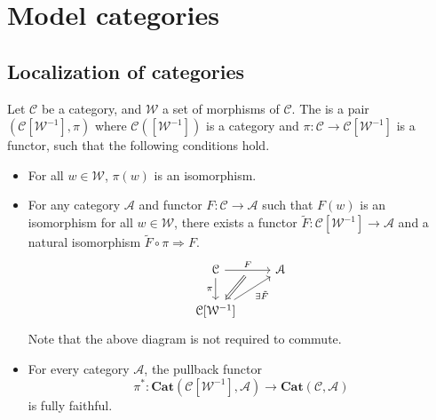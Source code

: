 \documentclass[main.tex]{subfiles}
\begin{document}
\chapter{Model categories}
\label{ch:model_categories}

\section{Localization of categories}
\label{sec:localization_of_categories}

\begin{definition}
  \label{def:localization_of_a_category}
  Let $\mathcal{C}$ be a category, and $\mathcal{W}$ a set of morphisms of $\mathcal{C}$. The  is a pair $(\mathcal{C}[\mathcal{W}^{-1}], \pi)$ where $\mathcal{C}([\mathcal{W}^{-1}])$ is a category and $\pi\colon \mathcal{C} \to \mathcal{C}[\mathcal{W}^{-1}]$ is a functor, such that the following conditions hold.

  \begin{itemize}
    \item For all $w \in \mathcal{W}$, $\pi(w)$ is an isomorphism.

    \item For any category $\mathcal{A}$ and functor $F\colon \mathcal{C} \to \mathcal{A}$ such that $F(w)$ is an isomorphism for all $w \in \mathcal{W}$, there exists a functor $\tilde{F}\colon \mathcal{C}[\mathcal{W}^{-1}] \to \mathcal{A}$ and a natural isomorphism $\tilde{F} \circ \pi \Rightarrow F$.
      \begin{equation*}
        \begin{tikzcd}
          \mathcal{C}
          \arrow[r, swap, ""'{name=A}, swap, "F"]
          \arrow[d, swap, "\pi"]
          & \mathcal{A}
          \\
          \mathcal{C}[\mathcal{W}^{-1}]
          \arrow[ur, swap, "\exists\tilde{F}"]
          \arrow[from=A, Rightarrow]
        \end{tikzcd}
      \end{equation*}
      Note that the above diagram is not required to commute.

    \item For every category $\mathcal{A}$, the pullback functor
      \begin{equation*}
        \pi^{*}\colon \mathbf{Cat}(\mathcal{C}[\mathcal{W}^{-1}], \mathcal{A}) \to \mathbf{Cat}(\mathcal{C}, \mathcal{A})
      \end{equation*}
      is fully faithful.
  \end{itemize}
\end{definition}
\end{document}
